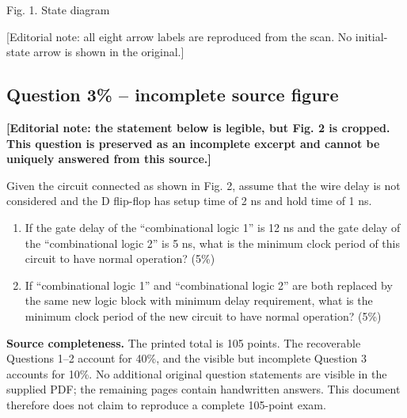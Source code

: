 \documentclass[11pt,a4paper]{article}
\newcommand{\question}[2]{\subsection*{Question #1\hfill\normalfont #2}}
\begin{document}
\begin{center}

Fig. 1. State diagram
\end{center}
{\small [Editorial note: all eight arrow labels are reproduced from the scan.
No initial-state arrow is shown in the original.]}

\newpage
\question{3}{10\% -- incomplete source figure}
\textbf{[Editorial note: the statement below is legible, but Fig. 2 is cropped.
This question is preserved as an incomplete excerpt and cannot be uniquely
answered from this source.]}

Given the circuit connected as shown in Fig. 2, assume that the wire delay is
not considered and the D flip-flop has setup time of 2 ns and hold time of
1 ns.
\begin{enumerate}[label=(\alph*)]
\item If the gate delay of the ``combinational logic 1'' is 12 ns and the gate
delay of the ``combinational logic 2'' is 5 ns, what is the minimum clock
period of this circuit to have normal operation? (5\%)
\item If ``combinational logic 1'' and ``combinational logic 2'' are both
replaced by the same new logic block with minimum delay requirement, what
is the minimum clock period of the new circuit to have normal operation?
(5\%)
\end{enumerate}

\begin{center}
\end{center}

\vfill
{\small\textbf{Source completeness.} The printed total is 105 points. The
recoverable Questions 1--2 account for 40\%, and the visible but incomplete
Question 3 accounts for 10\%. No additional original question statements are
visible in the supplied PDF; the remaining pages contain handwritten answers.
This document therefore does not claim to reproduce a complete 105-point exam.}
\end{document}
